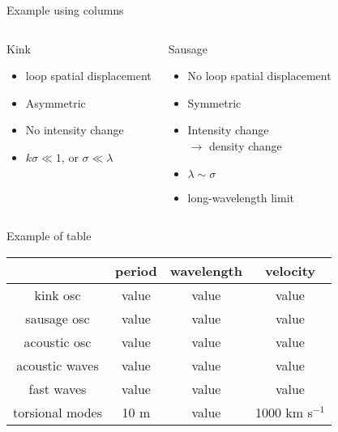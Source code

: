 \documentclass{beamer}
\begin{document}
\begin{frame}{Example using columns}
\begin{columns}
    \begin{block}{Kink}
        \begin{itemize}
            \item loop spatial displacement
            \item Asymmetric
            \item No intensity change
            \item $k\sigma \ll 1$, or $\sigma\ll\lambda$
        \end{itemize}
    \end{block}
    \begin{block}{Sausage}
        \begin{itemize}
            \item No loop spatial displacement
            \item Symmetric
            \item Intensity change\\ $\rightarrow$ density change
            \item $\lambda\sim\sigma$
            \item long-wavelength limit
        \end{itemize}
    \end{block}
\end{columns}
\end{frame}%
\begin{frame}{Example of table}
    \begin{center}
        \begin{tabular}{c|c|c|c|}
            \cline{2-4} & {\textbf{period}} & {\textbf{wavelength}} &
                {\textbf{velocity}}\\
            \hline \multicolumn{0}{|c|}{kink osc} & value & value & value\\
            \hline \multicolumn{0}{|c|}{sausage osc} & value & value & value\\
            \hline \multicolumn{0}{|c|}{acoustic osc} & value & value & value\\
            \hline \multicolumn{0}{|c|}{acoustic waves} & value & value & value\\
            \hline \multicolumn{0}{|c|}{fast waves} & value & value & value\\
            \hline \multicolumn{0}{|c|}{torsional modes} & 10 m & value &
                1000 km s$^{-1}$\\
            \hline
        \end{tabular}
    \end{center}
\end{frame}%
\end{document}
